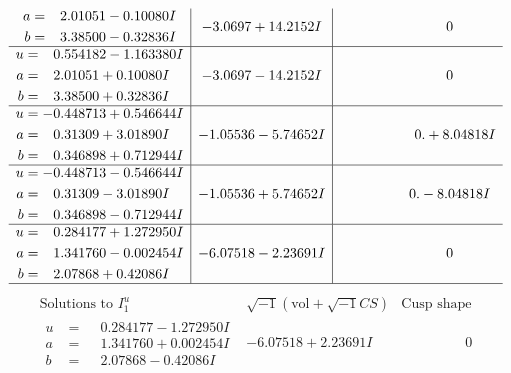 \documentclass[1p]{elsarticle_modified}
\theoremstyle{definition}
\newcommand{\I}{\sqrt{-1}}
\begin{document}
$$\begin{array}{c|c|c}
\begin{aligned}
a &= \phantom{-}2.01051 - 0.10080 I \\
b &= \phantom{-}3.38500 - 0.32836 I\end{aligned}
 & -3.0697 + 14.2152 I & \phantom{-0.000000 } 0 \\ \hline\begin{aligned}
u &= \phantom{-}0.554182 - 1.163380 I \\
a &= \phantom{-}2.01051 + 0.10080 I \\
b &= \phantom{-}3.38500 + 0.32836 I\end{aligned}
 & -3.0697 - 14.2152 I & \phantom{-0.000000 } 0 \\ \hline\begin{aligned}
u &= -0.448713 + 0.546644 I \\
a &= \phantom{-}0.31309 + 3.01890 I \\
b &= \phantom{-}0.346898 + 0.712944 I\end{aligned}
 & -1.05536 - 5.74652 I & \phantom{-0.000000 -}0. + 8.04818 I \\ \hline\begin{aligned}
u &= -0.448713 - 0.546644 I \\
a &= \phantom{-}0.31309 - 3.01890 I \\
b &= \phantom{-}0.346898 - 0.712944 I\end{aligned}
 & -1.05536 + 5.74652 I & \phantom{-0.000000 } 0. - 8.04818 I \\ \hline\begin{aligned}
u &= \phantom{-}0.284177 + 1.272950 I \\
a &= \phantom{-}1.341760 - 0.002454 I \\
b &= \phantom{-}2.07868 + 0.42086 I\end{aligned}
 & -6.07518 - 2.23691 I & \phantom{-0.000000 } 0\\
 \hline 
 \end{array}$$\newpage$$\begin{array}{c|c|c}  
\text{Solutions to }I^u_{1}& \I (\text{vol} + \sqrt{-1}CS) & \text{Cusp shape}\\
 \hline 
\begin{aligned}
u &= \phantom{-}0.284177 - 1.272950 I \\
a &= \phantom{-}1.341760 + 0.002454 I \\
b &= \phantom{-}2.07868 - 0.42086 I\end{aligned}
 & -6.07518 + 2.23691 I & \phantom{-0.000000 } 0 \\ \hline\begin{aligned}

\end{aligned}
\end{array}$$
\end{document}
